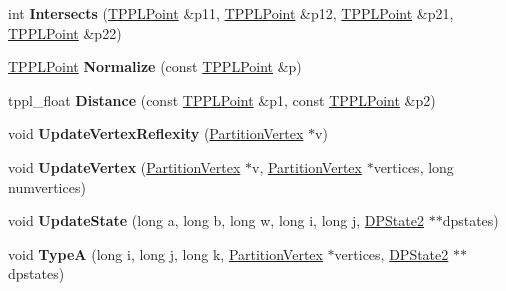 \begin{DoxyCompactItemize}
int {\bfseries Intersects} (\mbox{\hyperlink{struct_t_p_p_l_point}{T\+P\+P\+L\+Point}} \&p11, \mbox{\hyperlink{struct_t_p_p_l_point}{T\+P\+P\+L\+Point}} \&p12, \mbox{\hyperlink{struct_t_p_p_l_point}{T\+P\+P\+L\+Point}} \&p21, \mbox{\hyperlink{struct_t_p_p_l_point}{T\+P\+P\+L\+Point}} \&p22)
\item 
\mbox{\label{class_t_p_p_l_partition_a4a4ebfd775d9e3dee45af818324559f2}} 
\mbox{\hyperlink{struct_t_p_p_l_point}{T\+P\+P\+L\+Point}} {\bfseries Normalize} (const \mbox{\hyperlink{struct_t_p_p_l_point}{T\+P\+P\+L\+Point}} \&p)
\item 
\mbox{\label{class_t_p_p_l_partition_abead0ad7d085be406a47e7fa4e27bb09}} 
tppl\+\_\+float {\bfseries Distance} (const \mbox{\hyperlink{struct_t_p_p_l_point}{T\+P\+P\+L\+Point}} \&p1, const \mbox{\hyperlink{struct_t_p_p_l_point}{T\+P\+P\+L\+Point}} \&p2)
\item 
\mbox{\label{class_t_p_p_l_partition_a6347c1de89281954e8ad0787f23071b4}} 
void {\bfseries Update\+Vertex\+Reflexity} (\mbox{\hyperlink{struct_t_p_p_l_partition_1_1_partition_vertex}{Partition\+Vertex}} $\ast$v)
\item 
\mbox{\label{class_t_p_p_l_partition_a0d2fda47beb39202b21239e551762571}} 
void {\bfseries Update\+Vertex} (\mbox{\hyperlink{struct_t_p_p_l_partition_1_1_partition_vertex}{Partition\+Vertex}} $\ast$v, \mbox{\hyperlink{struct_t_p_p_l_partition_1_1_partition_vertex}{Partition\+Vertex}} $\ast$vertices, long numvertices)
\item 
\mbox{\label{class_t_p_p_l_partition_a9d7429531f0b309c55a100dee5e88c90}} 
void {\bfseries Update\+State} (long a, long b, long w, long i, long j, \mbox{\hyperlink{struct_t_p_p_l_partition_1_1_d_p_state2}{D\+P\+State2}} $\ast$$\ast$dpstates)
\item 
\mbox{\label{class_t_p_p_l_partition_a8d7de7c3080c27e3da05fb9bc97d8c99}} 
void {\bfseries TypeA} (long i, long j, long k, \mbox{\hyperlink{struct_t_p_p_l_partition_1_1_partition_vertex}{Partition\+Vertex}} $\ast$vertices, \mbox{\hyperlink{struct_t_p_p_l_partition_1_1_d_p_state2}{D\+P\+State2}} $\ast$$\ast$dpstates)
\item 

\end{DoxyCompactItemize}
